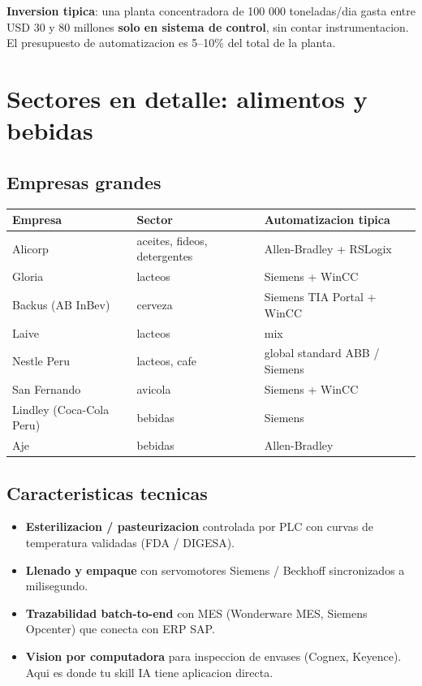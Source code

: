 \documentclass[11pt,a4paper,oneside]{report}
\begin{document}
\begin{datos}
\textbf{Inversion tipica}: una planta concentradora de 100 000 toneladas/dia
gasta entre USD 30 y 80 millones \textbf{solo en sistema de control}, sin
contar instrumentacion. El presupuesto de automatizacion es 5--10\% del
total de la planta.
\end{datos}

\chapter{Sectores en detalle: alimentos y bebidas}

\section{Empresas grandes}

\begin{center}
\begin{tabular}{p{3.5cm}p{4cm}p{4cm}}
\toprule
\textbf{Empresa} & \textbf{Sector} & \textbf{Automatizacion tipica} \\
\midrule
Alicorp                       & aceites, fideos, detergentes & Allen-Bradley + RSLogix \\
Gloria                        & lacteos & Siemens + WinCC \\
Backus (AB InBev)             & cerveza & Siemens TIA Portal + WinCC \\
Laive                         & lacteos & mix \\
Nestle Peru                   & lacteos, cafe & global standard ABB / Siemens \\
San Fernando                  & avicola & Siemens + WinCC \\
Lindley (Coca-Cola Peru)      & bebidas & Siemens \\
Aje                          & bebidas & Allen-Bradley \\
\bottomrule
\end{tabular}
\end{center}

\section{Caracteristicas tecnicas}

\begin{itemize}[leftmargin=2em]
  \item \textbf{Esterilizacion / pasteurizacion} controlada por PLC con
        curvas de temperatura validadas (FDA / DIGESA).
  \item \textbf{Llenado y empaque} con servomotores Siemens / Beckhoff
        sincronizados a milisegundo.
  \item \textbf{Trazabilidad batch-to-end} con MES (Wonderware MES, Siemens
        Opcenter) que conecta con ERP SAP.
  \item \textbf{Vision por computadora} para inspeccion de envases (Cognex,
        Keyence). Aqui es donde tu skill IA tiene aplicacion directa.
\end{itemize}
\end{document}
